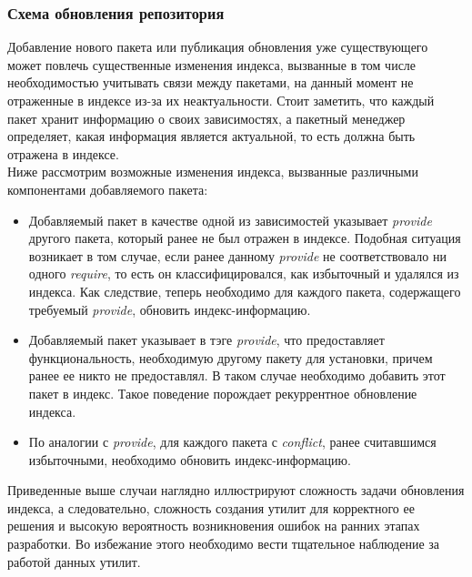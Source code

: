 \subsubsection{Схема обновления репозитория}
Добавление нового пакета или публикация обновления уже существующего
может повлечь существенные изменения индекса, вызванные в том числе
необходимостью учитывать связи между пакетами, на данный момент не
отраженные в индексе из-за их неактуальности. Стоит заметить, что 
каждый пакет хранит информацию о своих зависимостях, а пакетный
менеджер определяет, какая информация является актуальной, то есть
должна быть отражена в индексе.\\
Ниже рассмотрим возможные изменения индекса, вызванные различными
компонентами добавляемого пакета:
\begin{itemize}
\item
Добавляемый пакет в качестве одной из зависимостей указывает \textit{provide}
другого пакета, который ранее не был отражен в индексе. Подобная ситуация
возникает в том случае, если ранее данному \textit{provide} не соответствовало ни 
одного \textit{require}, то есть он классифицировался, как избыточный и удалялся
из индекса. Как следствие, теперь необходимо для каждого пакета, содержащего
требуемый \textit{provide}, обновить индекс-информацию.
\item
Добавляемый пакет указывает в тэге \textit{provide}, что предоставляет функциональность,
необходимую другому пакету для установки, причем ранее ее никто не предоставлял. В таком
случае необходимо добавить этот пакет в индекс. 
Такое поведение порождает рекуррентное обновление индекса.
\item
По аналогии с \textit{provide}, для каждого пакета с \textit{conflict}, ранее считавшимся
избыточными, необходимо обновить индекс-информацию.

\end{itemize}

Приведенные выше случаи наглядно иллюстрируют сложность задачи обновления индекса, а 
следовательно, сложность создания утилит для корректного ее решения и высокую вероятность
возникновения ошибок на ранних этапах разработки. Во избежание этого необходимо вести
тщательное наблюдение за работой данных утилит.
